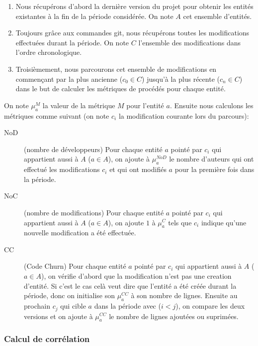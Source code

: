 \begin{enumerate}
\item  Nous récupérons d'abord la dernière version du projet pour obtenir les entités existantes à la fin de la période considérée. On note $A$ cet ensemble d'entités.
\item Toujours grâce aux commandes git, nous récupérons toutes les modifications effectuées durant la période. On note $C$ l'ensemble des modifications dans l'ordre chronologique.
\item  Troisièmement, nous parcourons cet ensemble de modifications en commençant par la plus ancienne ($c_0 \in C$) jusqu'à la plus récente ($c_n \in C$) dans le but de calculer les métriques de procédés pour chaque entité.
\end{enumerate}

 On note $\mu_{a}^{M}$ la valeur de la métrique $M$ pour l'entité $a$. Ensuite nous calculons les métriques comme suivant (on note $c_i$ la modification courante lors du parcours):

\begin{description}
	\item[NoD] (nombre de développeurs) Pour chaque entité $a$ pointé par $c_i$ qui appartient aussi à $A$ ($a \in A$), on ajoute à $\mu_{a}^{NoD}$ le nombre d'auteurs qui ont effectué les modifications $c_i$ et qui ont modifiés $a$ pour la première fois dans la période.
	\item[NoC] (nombre de modifications) Pour chaque entité $a$ pointé par $c_i$ qui appartient aussi à $A$ ($a \in A$), on ajoute $1$ à $\mu_{a}^{C}$ tels que $c_i$ indique qu'une nouvelle modification a été effectuée.
	\item[CC] (Code Churn) Pour chaque entité $a$ pointé par $c_i$ qui appartient aussi à $A$ ($a \in A$), on vérifie d'abord que la modification n'est pas une creation d'entité. Si c'est le cas celà veut dire que l'entité a été créée durant la période, donc on initialise son $\mu_{a}^{CC}$ à son nombre de lignes. Ensuite au prochain $c_j$ qui cible $a$ dans la période avec ($i < j$), on compare les deux versions et on ajoute à $\mu_{a}^{CC}$ le nombre de lignes ajoutées ou suprimées.
\end{description}

\subsubsection{Calcul de corrélation}

